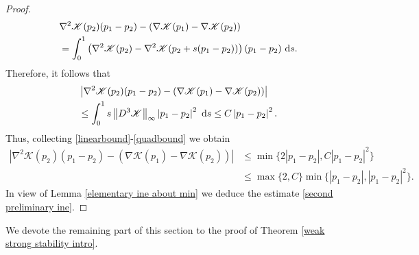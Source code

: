 \documentclass[11pt,reqno]{amsart}
\numberwithin{equation}{section}
\def\dd{{\rm d}}
\begin{document}
\begin{proof}
\begin{align*}
&\nabla^{2}\mathscr{K}(p_{2})(p_{1}-p_{2})-(\nabla \mathscr{K}(p_{1})-\nabla \mathscr{K}(p_{2}))\\
&= \int_{0}^{1}\left(\nabla^{2}\mathscr{K}(p_{2})-\nabla^{2}\mathscr{K}(p_{2}+s(p_{1}-p_{2}))\right)(p_{1}-p_{2})\ \dd s.   
\end{align*}    
Therefore, it follows that 
\begin{align}
&\left\vert \nabla^{2}\mathscr{K}(p_{2})(p_{1}-p_{2})-(\nabla \mathscr{K}(p_{1})-\nabla \mathscr{K}(p_{2}))\right\vert \notag\\
&\leq \int_{0}^{1} s\left\Vert D^{3}\mathscr{K}\right\Vert_{\infty}  \left\vert p_{1}-p_{2}\right\vert^{2}\ \dd s\leq C\left\vert p_{1}-p_{2}\right\vert^{2}.   \label{quadbound}  
\end{align}
Thus, collecting \eqref{linearbound}-\eqref{quadbound} we obtain 
\begin{align*}
\left\vert \nabla^{2}\mathscr{K}(p_{2})(p_{1}-p_{2})-(\nabla \mathscr{K}(p_{1})-\nabla \mathscr{K}(p_{2}))\right\vert&\leq \min\{2\left\vert p_{1}-p_{2}\right\vert,C\left\vert p_{1}-p_{2}\right\vert^{2} \}\\
&\leq \max\{2,C\}\min\{\left\vert p_{1}-p_{2}\right\vert ,\left\vert p_{1}-p_{2}\right\vert^{2}\}.    
\end{align*}
In view of Lemma \eqref{elementary ine about min} we deduce the estimate \eqref{second preliminary ine}. 
\end{proof}
We devote the remaining part of this section to the proof of Theorem \ref{weak strong stability intro}.

\vspace{0.4 cm}
\end{document}
